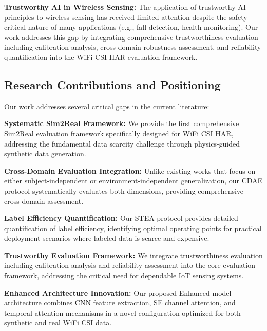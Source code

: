 \textbf{Trustworthy AI in Wireless Sensing:} The application of trustworthy AI principles to wireless sensing has received limited attention despite the safety-critical nature of many applications (e.g., fall detection, health monitoring). Our work addresses this gap by integrating comprehensive trustworthiness evaluation including calibration analysis, cross-domain robustness assessment, and reliability quantification into the WiFi CSI HAR evaluation framework.

\subsection{Research Contributions and Positioning}

Our work addresses several critical gaps in the current literature:

\textbf{Systematic Sim2Real Framework:} We provide the first comprehensive Sim2Real evaluation framework specifically designed for WiFi CSI HAR, addressing the fundamental data scarcity challenge through physics-guided synthetic data generation.

\textbf{Cross-Domain Evaluation Integration:} Unlike existing works that focus on either subject-independent or environment-independent generalization, our CDAE protocol systematically evaluates both dimensions, providing comprehensive cross-domain assessment.

\textbf{Label Efficiency Quantification:} Our STEA protocol provides detailed quantification of label efficiency, identifying optimal operating points for practical deployment scenarios where labeled data is scarce and expensive.

\textbf{Trustworthy Evaluation Framework:} We integrate trustworthiness evaluation including calibration analysis and reliability assessment into the core evaluation framework, addressing the critical need for dependable IoT sensing systems.

\textbf{Enhanced Architecture Innovation:} Our proposed Enhanced model architecture combines CNN feature extraction, SE channel attention, and temporal attention mechanisms in a novel configuration optimized for both synthetic and real WiFi CSI data.